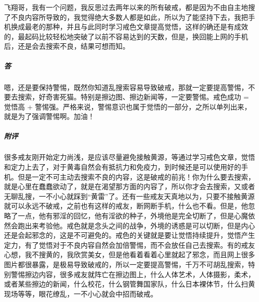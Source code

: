 \begin{case}
    飞翔哥，我有一个问题，我反思过去两年以来的所有破戒，都是因为不由自主地搜了不良内容所导致的，我觉得绝大多数人都是如此，所以为了能坚持下去，我把手机换成最老的那种，并且与此同时学习戒色文章提高觉悟，这样的确还是有成效的，最起码比较轻松地突破了以前不容易达到的天数，但是，换回能上网的手机后，还是会去搜索不良，结果可想而知。
    \subparagraph{答} 嗯，还是要保持警惕，既然你知道乱搜索容易导致破戒，那就一定要提高警惕，不要去搜索，好奇害死猫。特别是擦边图、擦边新闻等，一定要警惕。戒色成功 = 觉悟高 + 警惕强。严格来说，警惕意识也属于觉悟的一部分，之所以单列出来，就是为了强调警惕啊。加油！
    \subparagraph{附评} 很多戒友刚开始定力尚浅，是应该尽量避免接触黄源，等通过学习戒色文章，觉悟和定力上去了，对于黄毒自然会有抵抗力和免疫力，到时候还是可以使用好的手机。但是一定不可主动去搜索不良的内容，这是破戒的前兆！你为什么要去搜索，就是心里在蠢蠢欲动了，就是在渴望那方面的内容了，所以你才会去搜索，又或者无聊乱搜，一不小心就踩到“黄雷”了。还有一些戒友天真地以为，只要不接触黄源就可以永远不破戒，之前也有这样的戒友，断网断手机，什么也不看。但是，他忽略了一点，他有邪淫的回忆，他有淫欲的种子，外境他是完全切断了，但是心魔依然会跑出来考验他。戒色就是念头之间的战争，外境的诱惑是可以切断，但是内心还是会起邪念的，这是不可避免的。戒色的关键就是要让觉悟持续提升，觉悟产生定力，有了觉悟对于不良内容自然会加倍警惕，而不会放任自己去搜索。有的戒友心想，我不搜黄的，我欣赏美女，但是他看着看着心里就起了邪念，而且网上很多图片都很暴露，是极易导致破戒的，所以一定要提高警惕，千万不可胡乱搜索，特别警惕擦边内容，很多戒友就阵亡在擦边图上，什么人体艺术，人体摄影，柔术，或者某些擦边的新闻，什么校花，什么钢管舞国家队，什么日本裸体节，什么扫黄现场等等，眼花缭乱，一不小心就会中招而破戒。
\end{case}

